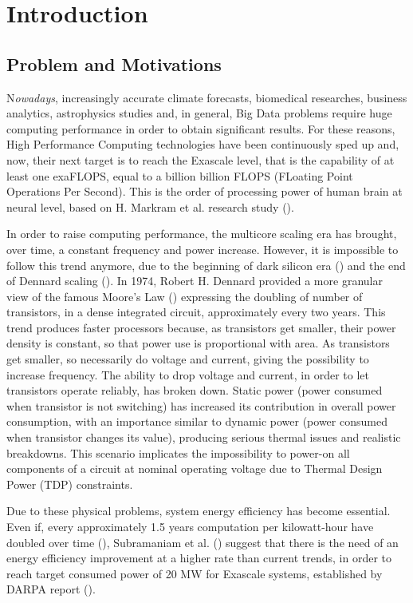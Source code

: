 \chapter{Introduction}

\section{Problem and Motivations}

\lettrine{N}{}\textit{owadays}, increasingly accurate climate forecasts, biomedical researches, business analytics, astrophysics studies and, in general, Big Data problems require huge computing performance in order to obtain significant results. For these reasons, High Performance Computing technologies have been continuously sped up and, now, their next target is to reach the Exascale level, that is the capability of at least one exaFLOPS, equal to a billion billion FLOPS (FLoating Point Operations Per Second). This is the order of processing power of human brain at neural level, based on H. Markram et al. research study (\cite{markram2011introducing}).

In order to raise computing performance, the multicore scaling era has brought, over time, a constant frequency and power increase. However, it is impossible to follow this trend anymore, due to the beginning of dark silicon era (\cite{esmaeilzadeh2011dark}) and the end of Dennard scaling (\cite{dennard1974design}). In 1974, Robert H. Dennard provided a more granular view of the famous Moore's Law (\cite{moore1998cramming}) expressing the doubling of number of transistors, in a dense integrated circuit, approximately every two years. This trend produces faster processors because, as transistors get smaller, their power density is constant, so that power use is proportional with area. As transistors get smaller, so necessarily do voltage and current, giving the possibility to increase frequency. The ability to drop voltage and current, in order to let transistors operate reliably, has broken down. Static power (power consumed when transistor is not switching) has increased its contribution in overall power consumption, with an importance similar to dynamic power (power consumed when transistor changes its value), producing serious thermal issues and realistic breakdowns. This scenario implicates the impossibility to power-on all components of a circuit at nominal operating voltage due to Thermal Design Power (TDP) constraints.

Due to these physical problems, system energy efficiency has become essential. Even if, every approximately 1.5 years computation per kilowatt-hour have doubled over time (\cite{koomey2011implications}), Subramaniam et al. (\cite{subramaniam2013trends}) suggest that there is the need of an energy efficiency improvement at a higher rate than current trends, in order to reach target consumed power of 20 MW for Exascale systems, established by DARPA report (\cite{bergman2008exascale}).

